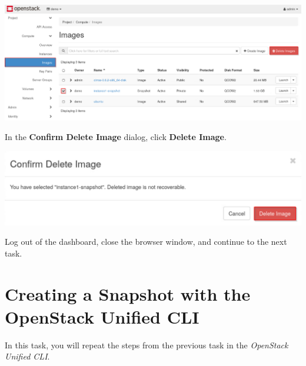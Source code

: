 \documentclass[letterpaper, 12pt]{article}
\begin{document}
\begin{enumerate}
\begin{labstep}
        \begin{center}
            \includegraphics[width=\linewidth]{images/part1/step20.png}
        \end{center}
    \end{labstep}

    \begin{labstep}
        In the \textbf{Confirm Delete Image} dialog, click \textbf{Delete Image}.

        \begin{center}
            \includegraphics[width=\linewidth]{images/part1/step21.png}
        \end{center}
    \end{labstep}

    \begin{labstep}
        Log out of the dashboard, close the browser window, and continue to the next task.
    \end{labstep}
\end{enumerate}

\section{Creating a Snapshot with the OpenStack Unified CLI}\label{sec:creating_a_snapshot_cli}
In this task, you will repeat the steps from the previous task in the \textit{OpenStack Unified CLI}.
\end{document}
